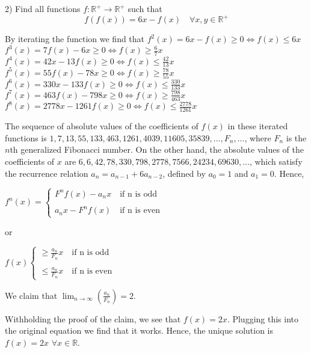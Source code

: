 \begin{solution}
	\begin{tcolorbox}2) Find all functions $f:\mathbb{R}^+\to\mathbb{R}^+$  such that
\[f(f(x))=6x-f(x) \quad \forall x,y \in \mathbb{R}^+\]\end{tcolorbox}
By iterating the function we find that
$f^2(x)=6x-f(x)\ge 0\Leftrightarrow f(x)\le 6x$
$f^3(x)=7f(x)-6x\ge 0\Leftrightarrow f(x)\ge \tfrac{6}{7}x$
$f^4(x)=42x-13f(x)\ge 0\Leftrightarrow f(x)\le \tfrac{42}{13}x$
$f^5(x)=55f(x)-78x\ge 0\Leftrightarrow f(x)\ge \tfrac{78}{55}x$
$f^6(x)=330x-133f(x)\ge 0\Leftrightarrow f(x)\le \tfrac{330}{133}x$
$f^7(x)=463f(x)-798x\ge 0\Leftrightarrow f(x)\ge \tfrac{798}{463}x$
$f^8(x)=2778x-1261f(x)\ge 0\Leftrightarrow f(x)\le \tfrac{2778}{1261}x$

The sequence of absolute values of the coefficients of $f(x)$ in these iterated functions is $1, 7, 13, 55, 133, 463, 1261, 4039, 11605, 35839,..., F_n,...$, where $F_n$ is the $n$th generalized Fibonacci number. On the other hand, the absolute values of the coefficients of $x$ are $6, 6, 42, 78, 330, 798, 2778, 7566, 24234, 69630,...$, which satisfy the recurrence relation $a_n = a_{n-1} + 6a_{n-2}$, defined by $a_0=1$ and $a_1=0$. Hence,

$f^n(x)= \begin{cases}F^nf(x)-a_nx\quad \text{if n is odd}\\ \\a_nx-F^nf(x)\quad \text{if n is even}\end{cases}$

or

$f(x) \begin{cases}\ge \frac{a_n}{F_n}x\quad \text{if n is odd}\\ \\\le \frac{a_n}{F_n}x\quad \text{if n is even}\end{cases}$

We claim that $\lim_{n\rightarrow \infty}\left(\frac{a_n}{F_n}\right)=2$.

Withholding the proof of the claim, we see that $f(x)=2x$. Plugging this into the original equation we find that it works. Hence, the unique solution is $\boxed{f(x)=2x}$ $\forall x\in \mathbb{R}$.
\end{solution}



